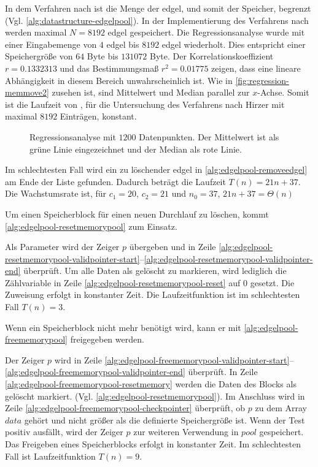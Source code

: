 In dem Verfahren nach \citeauthor{hirzer08} ist die Menge der \gls{edgel}, und somit der Speicher, begrenzt
 (Vgl. \autoref{alg:datastructure-edgelpool}). In der Implementierung des Verfahrens nach \citeauthor{hirzer08} werden
 maximal $N = 8192$ \gls{edgel} gespeichert. Die Regressionsanalyse wurde mit einer Eingabemenge von $4$ \gls{edgel}
 bis $8192$ \gls{edgel} wiederholt. Dies entspricht einer Speichergröße von $64$ Byte bis $131072$ Byte. Der
 Korrelationskoeffizient $r = 0.1332313$ und das Bestimmungsmaß $r^2 = 0.01775$ zeigen, dass eine lineare Abhängigkeit
 in diesem Bereich unwahrscheinlich ist. Wie in \autoref{fig:regression-memmove2} zusehen ist, sind Mittelwert und
 Median parallel zur $x$-Achse. Somit ist die Laufzeit von , für die Untersuchung des Verfahrens nach
 Hirzer mit maximal $8192$ Einträgen, konstant.
\begin{figure}[!ht]
	\centering
	
	\caption{Regressionsanalyse mit $1200$ Datenpunkten. Der Mittelwert ist als grüne Linie eingezeichnet und der
	 Median als rote Linie.}
	\label{fig:regression-memmove2}
\end{figure}
Im schlechtesten Fall wird ein zu löschender \gls{edgel} in \autoref{alg:edgelpool-removeedgel} am Ende der Liste
 gefunden. Dadurch beträgt die Laufzeit $T(n) = 21n + 37$. Die Wachstumsrate ist, für $c_{1} = 20$, $c_{2} = 21$ und
 $n_{0} = 37$, $21n + 37= \Theta(n)$

Um einen Speicherblock für einen neuen Durchlauf zu löschen, kommt \autoref{alg:edgelpool-resetmemorypool} zum Einsatz.

 Als Parameter wird der Zeiger $p$ übergeben und in Zeile
 \ref{alg:edgelpool-resetmemorypool-validpointer-start}--\ref{alg:edgelpool-resetmemorypool-validpointer-end}
 überprüft. Um alle Daten als gelöscht zu markieren, wird lediglich die Zählvariable in Zeile
 \ref{alg:edgelpool-resetmemorypool-reset} auf $0$ gesetzt. Die Zuweisung erfolgt in konstanter Zeit. Die
 Laufzeitfunktion ist im schlechtesten Fall $T(n) = 3$.

Wenn ein Speicherblock nicht mehr benötigt wird, kann er mit \autoref{alg:edgelpool-freememorypool} freigegeben werden.

 Der Zeiger $p$ wird in Zeile
 \ref{alg:edgelpool-freememorypool-validpointer-start}--\ref{alg:edgelpool-freememorypool-validpointer-end} überprüft.
 In Zeile \ref{alg:edgelpool-freememorypool-resetmemory} werden die Daten des Blocks als gelöscht markiert.
 (Vgl. \autoref{alg:edgelpool-resetmemorypool}). Im Anschluss wird in Zeile
 \ref{alg:edgelpool-freememorypool-checkpointer} überprüft, ob $p$ zu dem Array $\mathit{data}$ gehört und nicht größer
 als die definierte Speichergröße ist. Wenn der Test positiv ausfällt, wird der Zeiger $p$ zur weiteren Verwendung in
 $\mathit{pool}$ gespeichert. Das Freigeben eines Speicherblocks erfolgt in konstanter Zeit. Im schlechtesten Fall ist
 Laufzeitfunktion $T(n) = 9$.

